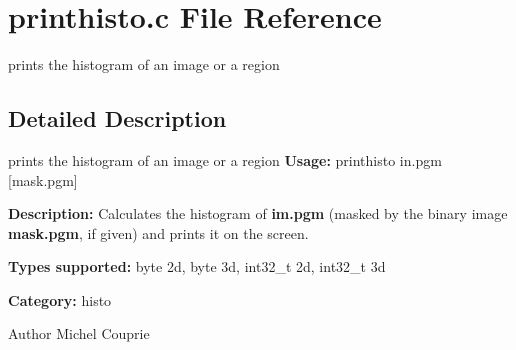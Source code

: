 \section{printhisto.c File Reference}
\label{printhisto_8c}


prints the histogram of an image or a region  




\subsection{Detailed Description}
prints the histogram of an image or a region {\bfseries Usage:} printhisto in.pgm [mask.pgm]

{\bfseries Description:} Calculates the histogram of {\bfseries im.pgm} (masked by the binary image {\bfseries mask.pgm}, if given) and prints it on the screen.

{\bfseries Types supported:} byte 2d, byte 3d, int32\_\-t 2d, int32\_\-t 3d

{\bfseries Category:} histo

\begin{DoxyAuthor}{Author}
Michel Couprie 
\end{DoxyAuthor}
